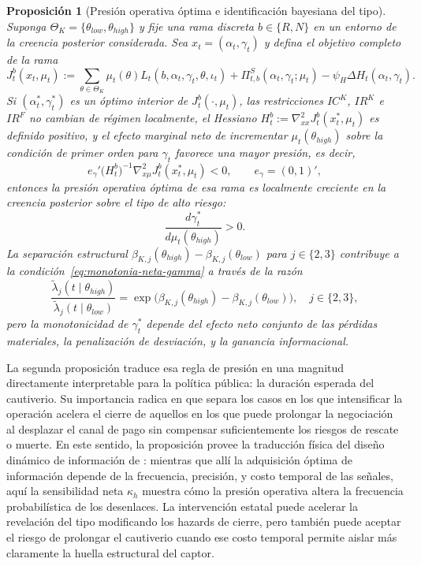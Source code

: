 \documentclass[pdflatex,sn-mathphys-ay]{sn-jnl}
\theoremstyle{thmstyleone}
\newtheorem{proposition}[theorem]{Proposición}
\theoremstyle{thmstyletwo}
\theoremstyle{thmstylethree}
\newcommand{\ThetaK}{\Theta_K}
\newcommand{\1}{\mathbf{1}}
\begin{document}
\begin{proposition}[Presión operativa óptima e identificación bayesiana del tipo]
\label{prop:optimal-gamma-beliefs}
Suponga $\ThetaK=\{\theta_{low},\theta_{high}\}$ y fije una rama discreta $b\in\{R,N\}$ en un entorno de la creencia posterior considerada. Sea $x_t=(\alpha_t,\gamma_t)$ y defina el objetivo completo de la rama
\begin{equation}
\label{eq:obj-rama-completo}
J_t^b(x_t,\mu_t)
:=
\sum_{\theta\in\ThetaK}\mu_t(\theta)L_t(b,\alpha_t,\gamma_t,\theta,\iota_t)
+\Pi_{t,b}^{S}(\alpha_t,\gamma_t;\mu_t)
-\psi_H\Delta H_t(\alpha_t,\gamma_t).
\end{equation}
Si $(\alpha_t^\ast,\gamma_t^\ast)$ es un óptimo interior de $J_t^b(\cdot,\mu_t)$, las restricciones $IC^K$, $IR^K$ e $IR^F$ no cambian de régimen localmente, el Hessiano $H_t^b:=\nabla_{xx}^2J_t^b(x_t^\ast,\mu_t)$ es definido positivo, y el efecto marginal neto de incrementar $\mu_t(\theta_{high})$ sobre la condición de primer orden para $\gamma_t$ favorece una mayor presión, es decir,
\begin{equation}
\label{eq:monotonia-neta-gamma}
e_\gamma'
\bigl(H_t^b\bigr)^{-1}
\nabla_{x\mu}^2J_t^b(x_t^\ast,\mu_t)
<0,
\qquad
e_\gamma=(0,1)',
\end{equation}
entonces la presión operativa óptima de esa rama es localmente creciente en la creencia posterior sobre el tipo de alto riesgo:
\[
\frac{d\gamma_t^\ast}{d\mu_t(\theta_{high})} > 0.
\]
La separación estructural $\beta_{K,j}(\theta_{high})-\beta_{K,j}(\theta_{low})$ para $j\in\{2,3\}$ contribuye a la condición~\eqref{eq:monotonia-neta-gamma} a través de la razón
\[
\frac{\tilde\lambda_j(t\mid\theta_{high})}{\tilde\lambda_j(t\mid\theta_{low})}
=\exp\!\bigl(\beta_{K,j}(\theta_{high})-\beta_{K,j}(\theta_{low})\bigr),
\quad j\in\{2,3\},
\]
pero la monotonicidad de $\gamma_t^\ast$ depende del efecto neto conjunto de las pérdidas materiales, la penalización de desviación, y la ganancia informacional.
\end{proposition}

\noindent La segunda proposición traduce esa regla de presión en una magnitud directamente interpretable para la política pública: la duración esperada del cautiverio. Su importancia radica en que separa los casos en los que intensificar la operación acelera el cierre de aquellos en los que puede prolongar la negociación al desplazar el canal de pago sin compensar suficientemente los riesgos de rescate o muerte. En este sentido, la proposición provee la traducción física del diseño dinámico de información de \citet{Zhong2022}: mientras que allí la adquisición óptima de información depende de la frecuencia, precisión, y costo temporal de las señales, aquí la sensibilidad neta $\kappa_h$ muestra cómo la presión operativa altera la frecuencia probabilística de los desenlaces. La intervención estatal puede acelerar la revelación del tipo modificando los hazards de cierre, pero también puede aceptar el riesgo de prolongar el cautiverio cuando ese costo temporal permite aislar más claramente la huella estructural del captor.
\end{document}

